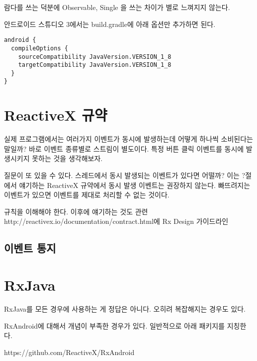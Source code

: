 \documentclass{book}
\begin{document}
람다를 쓰는 덕분에 Observable, Single 을 쓰는 차이가 별로 느껴지지 않는다.


안드로이드 스튜디오 3에서는 build.gradle에 아래 옵션만 추가하면 된다.
\begin{verbatim}
android {
  compileOptions {
    sourceCompatibility JavaVersion.VERSION_1_8
    targetCompatibility JavaVersion.VERSION_1_8
  }
}
\end{verbatim}

\begin{comment}
Java8을 지원하면 내용이 제거되니 지금은 대강만 쓰자.
자바 8부터 지원하는 람다식을 쓸 수 있다.
안드로이드 스튜디오에서 사용방법은 https://github.com/evant/gradle-retrolambda를 참고하자.
\end{comment}

\section{ReactiveX 규약}
실제 프로그램에서는 여러가지 이벤트가 동시에 발생하는데 어떻게 하나씩 소비된다는 말일까? 바로 이벤트 종류별로 스트림이 별도이다. 특정 버튼 클릭 이벤트를 동시에 발생시키지 못하는 것을 생각해보자. 

질문이 또 있을 수 있다. 스레드에서 동시 발생되는 이벤트가 있다면 어떨까? 이는 ?절에서 얘기하는 ReactiveX 규약에서 동시 발생 이벤트는 권장하지 않는다. 빠뜨려지는 이벤트가 있으면 이벤트를 제대로 처리할 수 없는 것이다.


규칙을 이해해야 한다. 이후에 얘기하는 것도 관련
http://reactivex.io/documentation/contract.html에 Rx Design 가이드라인

\subsection{이벤트 통지}

\section{RxJava}
RxJava를 모든 경우에 사용하는 게 정답은 아니다.
오히려 복잡해지는 경우도 있다.

RxAndroid에 대해서 개념이 부족한 경우가 있다. 일반적으로 아래 패키지를 지칭한다.

https://github.com/ReactiveX/RxAndroid
\end{document}
